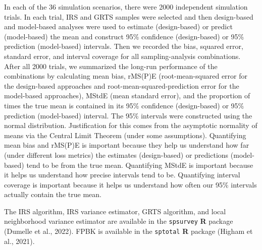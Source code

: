 \documentclass[]{elsarticle} %
\begin{document}
In each of the 36 simulation scenarios, there were 2000 independent
simulation trials. In each trial, IRS and GRTS samples were selected and
then design-based and model-based analyses were used to estimate
(design-based) or predict (model-based) the mean and construct 95\%
confidence (design-based) or 95\% prediction (model-based) intervals.
Then we recorded the bias, squared error, standard error, and interval
coverage for all sampling-analysis combinations. After all 2000 trials,
we summarized the long-run performance of the combinations by
calculating mean bias, rMS(P)E (root-mean-squared error for the
design-based approaches and root-mean-squared-prediction error for the
model-based approaches), MStdE (mean standard error), and the proportion
of times the true mean is contained in its 95\% confidence
(design-based) or 95\% prediction (model-based) interval. The 95\%
intervals were constructed using the normal distribution. Justification
for this comes from the asymptotic normality of means via the Central
Limit Theorem (under some assumptions). Quantifying mean bias and
rMS(P)E is important because they help us understand how far (under
different loss metrics) the estimates (design-based) or predictions
(model-based) tend to be from the true mean. Quantifying MStdE is
important because it helps us understand how precise intervals tend to
be. Quantifying interval coverage is important because it helps us
understand how often our 95\% intervals actually contain the true mean.

The IRS algorithm, IRS variance estimator, GRTS algorithm, and local
neighborhood variance estimator are available in the \texttt{spsurvey}
\textbf{\textsf{R}} package (Dumelle et al., 2022). FPBK is available in
the \texttt{sptotal} \textbf{\textsf{R}} package (Higham et al., 2021).
\end{document}
